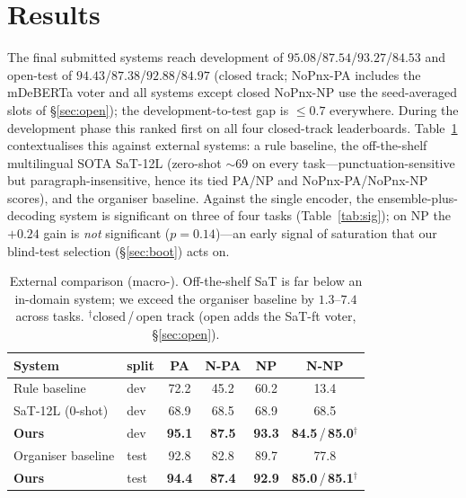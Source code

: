 \section{Results}\label{sec:results}
The final submitted systems reach development \fone{} of
$95.08$/$87.54$/$93.27$/$84.53$ and open-test \fone{} of
$94.43$/$87.38$/$92.88$/$84.97$ (closed track; NoPnx-PA includes the mDeBERTa
voter and all systems except closed NoPnx-NP use the seed-averaged slots of
\S\ref{sec:open}); the development-to-test gap is $\le0.7$ everywhere. During the development phase this ranked first on all four
closed-track leaderboards. Table~\ref{tab:baselines} contextualises this against
external systems: a rule baseline, the off-the-shelf multilingual SOTA SaT-12L
\citep{frohmann2024sat} (zero-shot $\sim$$69$ on every task---punctuation-sensitive
but paragraph-insensitive, hence its tied PA/NP and NoPnx-PA/NoPnx-NP scores), and the
organiser baseline. Against the single encoder, the ensemble-plus-decoding system is
significant on three of four tasks (Table~\ref{tab:sig}); on NP the $+0.24$ gain is
\emph{not} significant ($p{=}0.14$)---an early signal of saturation that our
blind-test selection (\S\ref{sec:boot}) acts on.

\begin{table}[t]\centering\small
\begin{tabular}{llcccc}
\toprule
System & split & PA & N-PA & NP & N-NP \\
\midrule
Rule baseline      & dev & 72.2 & 45.2 & 60.2 & 13.4 \\
SaT-12L (0-shot)   & dev & 68.9 & 68.5 & 68.9 & 68.5 \\
\textbf{Ours}      & dev & \textbf{95.1} & \textbf{87.5} & \textbf{93.3} & \textbf{84.5}\,/\,\textbf{85.0}$^{\dagger}$ \\
\midrule
Organiser baseline & test & 92.8 & 82.8 & 89.7 & 77.8 \\
\textbf{Ours}      & test & \textbf{94.4} & \textbf{87.4} & \textbf{92.9} & \textbf{85.0}\,/\,\textbf{85.1}$^{\dagger}$ \\
\bottomrule
\end{tabular}
\caption{External comparison (macro-\fone{}). Off-the-shelf SaT is far below an
in-domain system; we exceed the organiser baseline by $1.3$--$7.4$ across tasks.
$^{\dagger}$closed\,/\,open track (open adds the SaT-ft voter, \S\ref{sec:open}).}
\label{tab:baselines}
\end{table}

